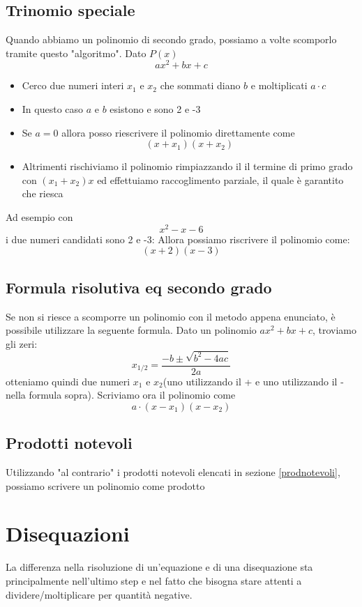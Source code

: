 \subsection{Trinomio speciale}
Quando abbiamo un polinomio di secondo grado, possiamo a volte scomporlo tramite questo "algoritmo". Dato $ P\left(x\right) $
\[
	ax^2 +bx + c
\]
\begin{itemize}
	\item Cerco due numeri interi $ x_1 $ e $ x_2 $ che sommati diano $ b $ e moltiplicati $ a \cdot c $
	\item In questo caso $ a $ e $ b $ esistono e sono 2 e -3
	\item Se $ a=0 $ allora posso riescrivere il polinomio direttamente come
	      \[
		      \left(x + x_1\right)\left(x + x_2\right)
	      \]
	\item Altrimenti rischiviamo il polinomio rimpiazzando il il termine di primo grado con $ \left(x_1 + x_2\right)x $ ed effettuiamo raccoglimento parziale, il quale è garantito che riesca
\end{itemize}
Ad esempio con
\[
	x^2  -x -6
\]
i due numeri candidati sono 2 e -3: Allora possiamo riscrivere il polinomio come:
\[
	\left(x+2\right) \left(x-3\right)
\]
\subsection{Formula risolutiva eq secondo grado}
Se non si riesce a scomporre un polinomio con il metodo appena enunciato, è possibile utilizzare la seguente formula. Dato un polinomio $ ax^2  + bx + c $, troviamo gli zeri:
\[
	x_{1 / 2} = \frac{-b \pm \sqrt{b^2 - 4ac}}{2a}
\]
otteniamo quindi due numeri $ x_1 $ e $ x_2 $(uno utilizzando il + e uno utilizzando il - nella formula sopra). Scriviamo ora il polinomio come
\[
	a\cdot \left(x-x_1\right)\left(x-x_2\right)
\]

\subsection{Prodotti notevoli}
Utilizzando "al contrario" i prodotti notevoli elencati in sezione \ref{prodnotevoli}, possiamo scrivere un polinomio come prodotto
\section{Disequazioni}
La differenza nella risoluzione di un'equazione e di una disequazione sta principalmente nell'ultimo step e nel fatto che bisogna stare attenti a dividere/moltiplicare per quantità negative.

